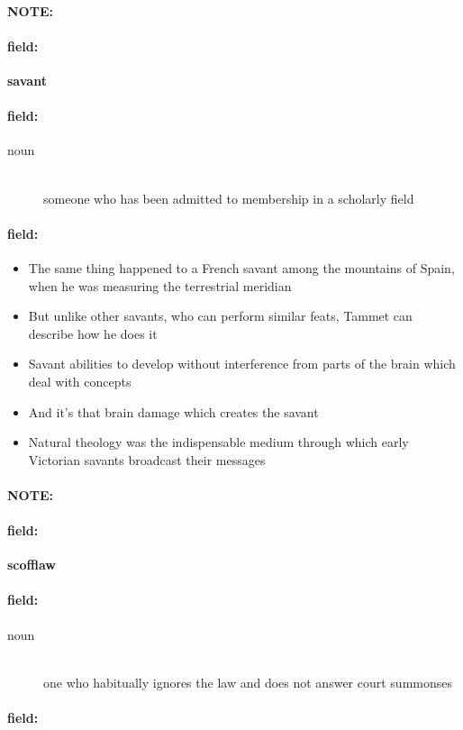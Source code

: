 \documentclass[12pt]{article}
\newenvironment{note}{\paragraph{NOTE:}}{}
\newenvironment{field}{\paragraph{field:}}{}
\begin{document}
\begin{note}
\begin{field}
\textbf{\large savant}
\end{field}


\begin{field}
\begin{description}
\item[noun] \hfill \\ 
someone who has been admitted to membership in a scholarly field

\end{description}
\end{field}

\begin{field}
\begin{itemize}
\item The same thing happened to a French savant among the mountains of Spain, when he was measuring the terrestrial meridian
\item But unlike other savants, who can perform similar feats, Tammet can describe how he does it
\item Savant abilities to develop without interference from parts of the brain which deal with concepts
\item And it's that brain damage which creates the savant
\item Natural theology was the indispensable medium through which early Victorian savants broadcast their messages
\end{itemize}
\end{field}
\end{note}
\begin{note}
\begin{field}
\textbf{\large scofflaw}
\end{field}


\begin{field}
\begin{description}
\item[noun] \hfill \\ 
one who habitually ignores the law and does not answer court summonses

\end{description}
\end{field}

\begin{field}
\end{field}
\end{note}
\end{document}
